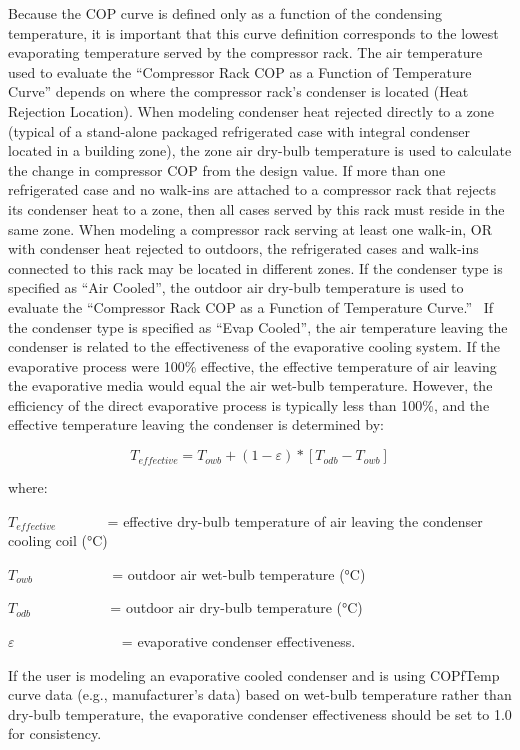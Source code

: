 Because the COP curve is defined only as a function of the condensing temperature, it is important that this curve definition corresponds to the lowest evaporating temperature served by the compressor rack. The air temperature used to evaluate the ``Compressor Rack COP as a Function of Temperature Curve'' depends on where the compressor rack's condenser is located (Heat Rejection Location). When modeling condenser heat rejected directly to a zone (typical of a stand-alone packaged refrigerated case with integral condenser located in a building zone), the zone air dry-bulb temperature is used to calculate the change in compressor COP from the design value. If more than one refrigerated case and no walk-ins are attached to a compressor rack that rejects its condenser heat to a zone, then all cases served by this rack must reside in the same zone. When modeling a compressor rack serving at least one walk-in, OR with condenser heat rejected to outdoors, the refrigerated cases and walk-ins connected to this rack may be located in different zones. If the condenser type is specified as ``Air Cooled'', the outdoor air dry-bulb temperature is used to evaluate the ``Compressor Rack COP as a Function of Temperature Curve.''~ If the condenser type is specified as ``Evap Cooled'', the air temperature leaving the condenser is related to the effectiveness of the evaporative cooling system. If the evaporative process were 100\% effective, the effective temperature of air leaving the evaporative media would equal the air wet-bulb temperature. However, the efficiency of the direct evaporative process is typically less than 100\%, and the effective temperature leaving the condenser is determined by:

\begin{equation}
{T_{effective}} = {T_{owb}} + (1 - \varepsilon )*[{T_{odb}} - {T_{owb}}]
\end{equation}

where:

\({T_{effective}}\) ~~~~~~ = effective dry-bulb temperature of air leaving the condenser cooling coil (°C)

\({T_{owb}}\) ~~~~~~~~~~ = outdoor air wet-bulb temperature (°C)

\({T_{odb}}\) ~~~~~~~~~~ = outdoor air dry-bulb temperature (°C)

\(\varepsilon\) ~~~~~~~~~~~~~~ = evaporative condenser effectiveness.

If the user is modeling an evaporative cooled condenser and is using COPfTemp curve data (e.g., manufacturer's data) based on wet-bulb temperature rather than dry-bulb temperature, the evaporative condenser effectiveness should be set to 1.0 for consistency.

